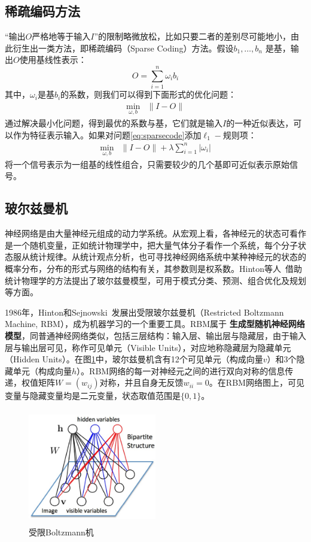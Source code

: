 \subsection{稀疏编码方法}
“输出$O$严格地等于输入$I$”的限制略微放松，比如只要二者的差别尽可能地小，由此衍生出一类方法，即稀疏编码（Sparse Coding）方法。假设$b_1,\ldots,b_n$ 是基，输出$O$使用基线性表示：
\[
    O = \sum\limits_{i=1}^n \omega_i b_i
\]
其中，$\omega_i$是基$b_i$的系数，则我们可以得到下面形式的优化问题：
\begin{equation}\label{eq:sparsecode}
    \begin{array}{ll}
      \min\limits_{\omega,b} & \|I-O\|
    \end{array}
\end{equation}
通过解决最小化问题，得到最优的系数与基，它们就是输入$I$的一种近似表达，可以作为特征表示输入。如果对问题\eqref{eq:sparsecode}添加$\ell_1-$规则项：
\begin{equation}\label{eq:regsparsecode}
    \begin{array}{ll}
      \min\limits_{\omega,b} & \|I-O\| + \lambda\sum\limits_{i=1}^n |\omega_i|
    \end{array}
\end{equation}
将一个信号表示为一组基的线性组合，只需要较少的几个基即可近似表示原始信号。

\subsection{玻尔兹曼机}
神经网络是由大量神经元组成的动力学系统。从宏观上看，各神经元的状态可看作是一个随机变量，正如统计物理学中，把大量气体分子看作一个系统，每个分子状态服从统计规律。从统计观点分析，也可寻找神经网络系统中某种神经元的状态的概率分布，分布的形式与网络的结构有关，其参数则是权系数。Hinton等人~\cite{hinton1983optimal}借助统计物理学的方法提出了玻尔兹曼模型，可用于模式分类、预测、组合优化及规划等方面。

1986年，Hinton和Sejnowski~\cite{hinton1986learning}发展出受限玻尔兹曼机（Restricted Boltzmann Machine, RBM），成为机器学习的一个重要工具。RBM属于
\textbf{生成型随机神经网络模型}，同普通神经网络类似，包括三层结构：输入层、输出层与隐藏层，由于输入层与输出层可见，称作可见单元（Visible Units），对应地称隐藏层为隐藏单元（Hidden Units）。在图\ref{fig:rbm}中，玻尔兹曼机含有12个可见单元（构成向量$v$）和3个隐藏单元（构成向量$h$）。RBM网络的每一对神经元之间的进行双向对称的信息传递，权值矩阵$W=(w_{ij})$对称，并且自身无反馈$w_{ii}=0$。在RBM网络图上，可见变量与隐藏变量均是二元变量，状态取值范围是$\{0,1\}$。
\begin{figure}[htbp]
  \centering
  \includegraphics[width=0.5\textwidth, height=5cm]{figures/rbm.eps}
  \caption{受限Boltzmann机}\label{fig:rbm}
\end{figure}

